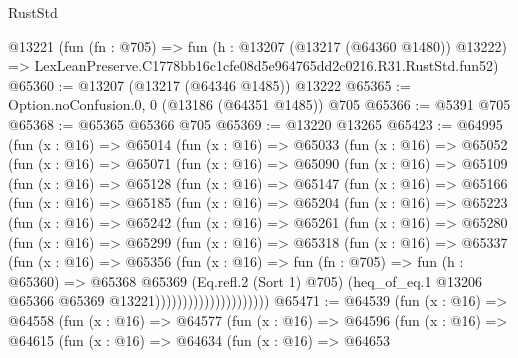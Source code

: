 \begin{lexlean}{RustStd}
\begin{coremodule}
    @13221
    (fun (fn : @705) =>
    fun (h : @13207 (@13217 (@64360 @1480)) @13222) =>
    LexLeanPreserve.C1778bb16c1cfe08d5e964765dd2c0216.R31.RustStd.fun52)
@65360 := @13207 (@13217 (@64346 @1485)) @13222
@65365 := Option.noConfusion.{0, 0} (@13186 (@64351 @1485)) @705
@65366 := @5391 @705
@65368 := @65365 @65366 @705
@65369 := @13220 @13265
@65423 := @64995
    (fun (x : @16) =>
    @65014
      (fun (x : @16) =>
      @65033
        (fun (x : @16) =>
        @65052
          (fun (x : @16) =>
          @65071
            (fun (x : @16) =>
            @65090
              (fun (x : @16) =>
              @65109
                (fun (x : @16) =>
                @65128
                  (fun (x : @16) =>
                  @65147
                    (fun (x : @16) =>
                    @65166
                      (fun (x : @16) =>
                      @65185
                        (fun (x : @16) =>
                        @65204
                          (fun (x : @16) =>
                          @65223
                            (fun (x : @16) =>
                            @65242
                              (fun (x : @16) =>
                              @65261
                                (fun (x : @16) =>
                                @65280
                                  (fun (x : @16) =>
                                  @65299
                                    (fun (x : @16) =>
                                    @65318
                                      (fun (x : @16) =>
                                      @65337
                                        (fun (x : @16) =>
                                        @65356
                                          (fun (x : @16) =>
                                          fun (fn : @705) =>
                                          fun (h : @65360) =>
                                          @65368
                                            @65369
                                            (Eq.refl.{2} (Sort 1) @705)
                                            (heq_of_eq.{1}
                                              @13206
                                              @65366
                                              @65369
                                              @13221)))))))))))))))))))))
@65471 := @64539
    (fun (x : @16) =>
    @64558
      (fun (x : @16) =>
      @64577
        (fun (x : @16) =>
        @64596
          (fun (x : @16) =>
          @64615
            (fun (x : @16) =>
            @64634
              (fun (x : @16) =>
              @64653

\end{coremodule}
\end{lexlean}
